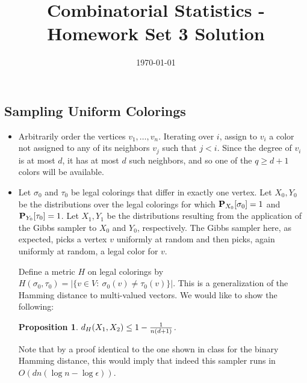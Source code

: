 \documentclass[11pt]{article} \usepackage{amssymb}
\newtheorem*{proposition*}{Proposition}
\begin{document}
\title{Combinatorial Statistics - Homework Set 3 Solution}

\date{\today}
\maketitle
\subsection{Sampling Uniform Colorings}
\begin{itemize}
\item Arbitrarily order the vertices $v_1,\ldots,v_n$. Iterating over $i$,
assign to $v_i$ a color not assigned to any of its neighbors $v_j$ such that
$j<i$. Since the degree of $v_i$ is at most $d$, it has at most $d$ such
neighbors, and so one of the $q\geq d+1$ colors will be available.

\item Let $\sigma_0$ and $\tau_0$ be legal colorings that differ in exactly
one vertex. 
Let $X_0,Y_0$ be the distributions over the legal colorings for which  
$\P_{X_0}[\sigma_0]=1$ and $\P_{Y_0}[\tau_0]=1$. Let  $X_1,Y_1$ be the distributions resulting from the
application of the Gibbs sampler to $X_0$ and $Y_0$, respectively. The Gibbs
sampler here, as expected, picks a vertex $v$ uniformly at random and then 
picks, again uniformly at random, a legal color for $v$.

Define a metric $H$ on legal colorings by  
$H(\sigma_0,\tau_0)=|\{v\in V :\:\sigma_0(v)\neq \tau_0(v)\}|$. This is a generalization of the Hamming 
distance to multi-valued vectors. We would like to show the following:
\begin{proposition*}
  $d_H(X_1,X_2)\leq 1-{1\over n(d+1)}$.
\end{proposition*}
Note that by a proof identical to the one shown in class for the binary Hamming
distance, this would imply that indeed this sampler runs in
$O(dn(\log n - \log \epsilon))$.
 

\end{itemize}
\end{document}
